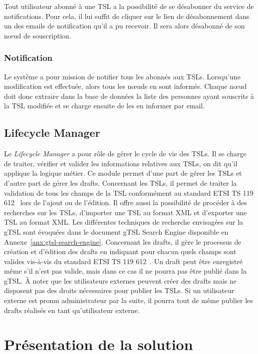 \documentclass{tnreport}
\begin{document}
Tout utilisateur abonné à une TSL a la possibilité de se désabonner du service de notifications. Pour cela, il lui suffit de cliquer sur le lien de désabonnement dans un des emails de notification qu'il a pu recevoir. Il sera alors désabonné de son nœud de souscription.

\subsubsection{Notification}

Le système a pour mission de notifier tous les abonnés aux TSLs. Lorsqu'une modification est effectuée, alors tous les nœuds en sont informés. Chaque nœud doit donc extraire dans la base de données la liste des personnes ayant souscrits à la TSL modifiée et se charge ensuite de les en informer par email.

\subsection{Lifecycle Manager}

Le \textit{Lifecycle Manager} a pour rôle de gérer le cycle de vie des TSLs. Il se charge de traiter, vérifier et valider les informations relatives aux TSLs, on dit qu'il applique la logique métier. Ce module permet d'une part de gérer les TSLs et d'autre part de gérer les drafts. Concernant les TSLs, il permet de traiter la validation de tous les champs de la TSL conformément au standard ETSI TS 119 612~\cite{ETSITS119612} lors de l'ajout ou de l'édition. Il offre aussi la possibilité de procéder à des recherches sur les TSLs, d'importer une TSL au format XML et d'exporter une TSL au format XML. Les différentes techniques de recherche envisagées sur la gTSL sont évoquées dans le document gTSL Search Engine disponible en Annexe~\ref{anx:gtsl-search-engine}. Concernant les drafts, il gère le processus de création et d'édition des drafts en indiquant pour chacun quels champs sont valides vis-à-vis du standard ETSI TS 119 612~\cite{ETSITS119612}. Un draft peut être enregistré même s'il n'est pas valide, mais dans ce cas il ne pourra pas être publié dans la gTSL. À noter que les utilisateurs externes peuvent créer des drafts mais ne disposent pas des droits nécessaires pour publier les TSLs. Si un utilisateur externe est promu administrateur par la suite, il pourra tout de même publier les drafts réalisés en tant qu'utilisateur externe.

\section{Présentation de la solution}
\end{document}

